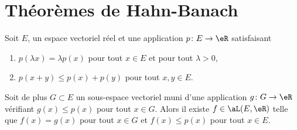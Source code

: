 \section{Théorèmes de Hahn-Banach}

\begin{theorem}
    Soit \( E\), un espace vectoriel réel et une application \( p\colon E\to \eR\) satisfaisant
    \begin{enumerate}
        \item
            \( p(\lambda x)=\lambda p(x)\) pour tout \( x\in E\) et pour tout \( \lambda>0\),
        \item
            \( p(x+y)\leq p(x)+p(y)\) pour tout \( x,y\in E\).
    \end{enumerate}
    Soit de plus \( G\subset E\) un sous-espace vectoriel muni d'une application \( g\colon G\to \eR\) vérifiant \( g(x)\leq p(x)\) pour tout \( x\in G\). Alors il existe \( f\in\aL(E,\eR)\) telle que \( f(x)=g(x)\) pour tout \( x\in G\) et \( f(x)\leq p(x)\) pour tout \( x\in E\).
\end{theorem}

